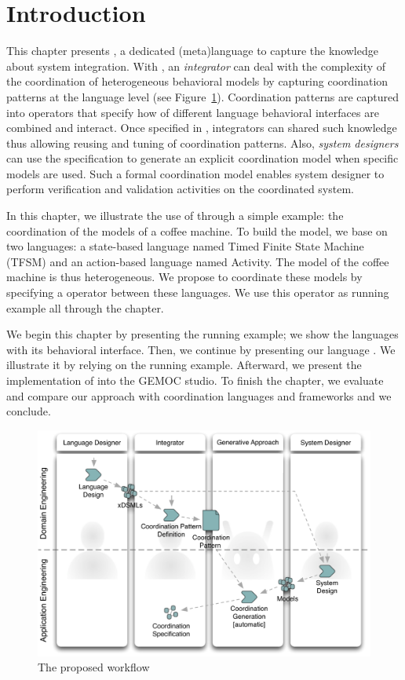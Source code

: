 \section{Introduction}
\label{sec:bcoolintro}
This chapter presents \bcool, a dedicated (meta)language to capture the knowledge about system integration. With \bcool, an \emph{integrator} can deal with the complexity of the coordination of heterogeneous behavioral models by capturing coordination patterns at the language level (see Figure~\ref{fig:proposedworkflow}). Coordination patterns are captured into operators that specify how \dse of different language behavioral interfaces are combined and interact. Once specified in \bcool, integrators can shared such knowledge thus allowing reusing and tuning of coordination patterns. Also, \emph{system designers} can use the \bcool specification to generate an explicit coordination model when specific models are used. Such a formal coordination model enables system designer to perform verification and validation activities on the coordinated system.     
	

In this chapter, we illustrate the use of \bcool through a simple example: the coordination of the models of a coffee machine. To build the model, we base on two languages: a state-based language named Timed Finite State Machine (TFSM) and an action-based language named Activity. The model of the coffee machine is thus heterogeneous. We propose to coordinate these models by specifying a \bcool operator between these languages. We use this operator as running example all through the chapter. 

We begin this chapter by presenting the running example; we show the languages with its behavioral interface. Then, we continue by presenting our language \bcool. We illustrate it by relying on the running example. Afterward, we present the implementation of \bcool into the GEMOC studio. To finish the chapter, we evaluate and compare our approach with coordination languages and frameworks and we conclude.


\begin{figure}
	\begin{center}
		\includegraphics[width=.6\textwidth]{bcool/figs/process}
		\caption{The proposed workflow}
		\label{fig:proposedworkflow}
	\end{center}
\end{figure}

